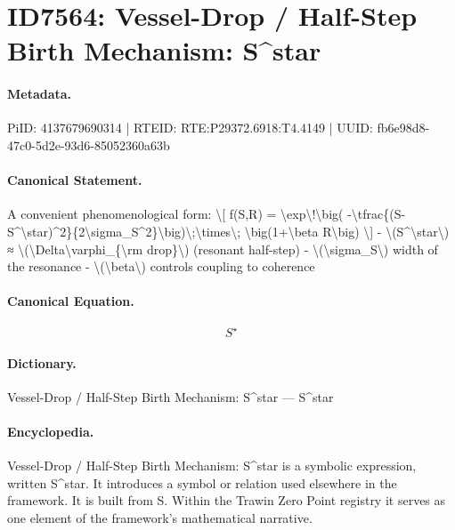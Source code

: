 \section*{ID7564: Vessel-Drop / Half-Step Birth Mechanism: S\textasciicircum{}star}
\paragraph{Metadata.}
PiID: 4137679690314 | RTEID: RTE:P29372.6918:T4.4149 | UUID: fb6e98d8-47c0-5d2e-93d6-85052360a63b

\paragraph{Canonical Statement.}
A convenient phenomenological form: \textbackslash{}[ f(S,R) = \textbackslash{}exp\textbackslash{}!\textbackslash{}big( -\textbackslash{}tfrac\{(S-S\textasciicircum{}\textbackslash{}star)\textasciicircum{}2\}\{2\textbackslash{}sigma\_S\textasciicircum{}2\}\textbackslash{}big)\textbackslash{};\textbackslash{}times\textbackslash{}; \textbackslash{}big(1+\textbackslash{}beta R\textbackslash{}big) \textbackslash{}] - \textbackslash{}(S\textasciicircum{}\textbackslash{}star\textbackslash{}) ≈ \textbackslash{}(\textbackslash{}Delta\textbackslash{}varphi\_\{\textbackslash{}rm drop\}\textbackslash{}) (resonant half-step) - \textbackslash{}(\textbackslash{}sigma\_S\textbackslash{}) width of the resonance - \textbackslash{}(\textbackslash{}beta\textbackslash{}) controls coupling to coherence

\paragraph{Canonical Equation.}
\[
S^\star
\]

\paragraph{Dictionary.}
Vessel-Drop / Half-Step Birth Mechanism: S\textasciicircum{}star — S\textasciicircum{}star

\paragraph{Encyclopedia.}
Vessel-Drop / Half-Step Birth Mechanism: S\textasciicircum{}star is a symbolic expression, written S\textasciicircum{}star. It introduces a symbol or relation used elsewhere in the framework. It is built from S. Within the Trawin Zero Point registry it serves as one element of the framework's mathematical narrative.

